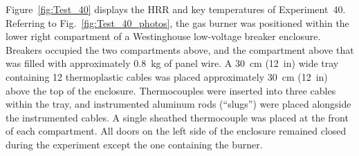 Figure~\ref{fig:Test_40} displays the HRR and key temperatures of Experiment~40. Referring to Fig.~\ref{fig:Test_40_photos}, the gas burner was positioned within the lower right compartment of a Westinghouse low-voltage breaker enclosure. Breakers occupied the two compartments above, and the compartment above that was filled with approximately 0.8~kg of panel wire. A 30~cm (12~in) wide tray containing 12 thermoplastic cables was placed approximately 30~cm (12~in) above the top of the enclosure. Thermocouples were inserted into three cables within the tray, and instrumented aluminum rods (``slugs'') were placed alongside the instrumented cables. A single sheathed thermocouple was placed at the front of each compartment. All doors on the left side of the enclosure remained closed during the experiment except the one containing the burner.

